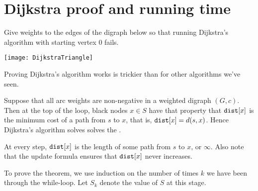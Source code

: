 \chapter{Dijkstra proof and running time} %
\begin{Boxample}[0.5] \label{ex:dijk-neg-fails}
Give weights to the edges of the digraph below so that running Dijkstra's algorithm 
with starting vertex $0$ fails. 
\vspace{0.5cm} 
\begin{center}
  \texttt{[image: DijkstraTriangle]}
\end{center}
\end{Boxample}

Proving Dijkstra's algorithm works is trickier than for other algorithms we've seen.


\begin{Theorem}
\label{thm:dijkstra} Suppose that all arc weights are non-negative in a weighted digraph $(G,c)$. 
Then at the top of the  loop, black nodes $x \in S$ have that property that $\operatorname{\text{\texttt{dist}}}[x]$  is the minimum cost of a path from $s$ to $x$, that is, $\operatorname{\text{\texttt{dist}}}[x] = d(s,x)$. Hence Dijkstra's algorithm solves solves the . 
\end{Theorem}
At every step, $\operatorname{\text{\texttt{dist}}}[x]$ is the length of some path from $s$ to $x$, or $\infty$. 
Also note that the update formula ensures that $\operatorname{\text{\texttt{dist}}}[x]$ never increases. 

To prove the theorem, we use induction on the number of times $k$ we
have been through the while-loop. Let $S_k$ denote the value of $S$
at this stage. 

